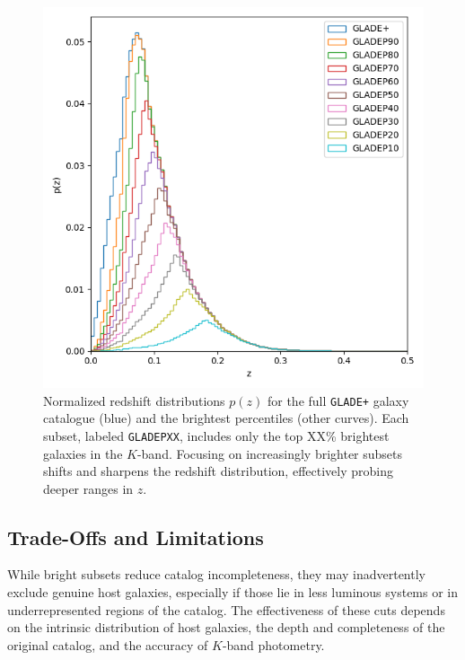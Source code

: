 \begin{figure}[h!]
  \centering
  \includegraphics[width=0.7\linewidth]{figures/z_dist_perc.png}
  \caption[Normalized redshift distributions $p(z)$ for the \texttt{GLADE+} galaxy catalogue and its brightest percentiles.]{Normalized redshift distributions $p(z)$ for the full \texttt{GLADE+} galaxy catalogue (blue) and the brightest percentiles (other curves). Each subset, labeled \texttt{GLADEPXX}, includes only the top XX\% brightest galaxies in the $K$-band. Focusing on increasingly brighter subsets shifts and sharpens the redshift distribution, effectively probing deeper ranges in $z$.}
  \label{fig:z_dist}
\end{figure}

\subsection{Trade-Offs and Limitations}

While bright subsets reduce catalog incompleteness, they may inadvertently exclude genuine host galaxies, especially if those lie in less luminous systems or in underrepresented regions of the catalog. The effectiveness of these cuts depends on the intrinsic distribution of host galaxies, the depth and completeness of the original catalog, and the accuracy of $K$-band photometry. 

